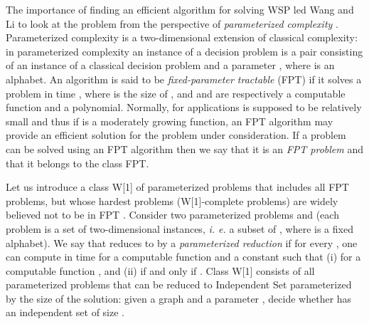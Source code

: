 \documentclass[jcs,crcready]{iosart1c}
\begin{document}
The importance of finding an efficient algorithm for solving WSP led Wang and Li to look at the problem from the perspective of \emph{parameterized complexity} \cite{DowFel13,Ni06}.
Parameterized complexity is a two-dimensional extension of classical complexity: in parameterized complexity an instance of a decision problem is a pair consisting of an instance  of a classical decision problem and a parameter , where  is an alphabet. An algorithm is said to be \emph{fixed-parameter tractable} (FPT) if it solves a problem in time , where  is the size of , and  and  are respectively a computable function and a polynomial. Normally, for applications  is supposed to be relatively small and thus if  is a moderately growing function, an FPT algorithm may provide an efficient solution for the problem under consideration. If a problem can be solved using an FPT algorithm then we say that it is an \emph{FPT problem} and that it belongs to the class FPT.

Let us introduce a class W[1] of parameterized problems that includes all FPT problems, but whose hardest problems (W[1]-complete problems) are widely believed not to be in FPT \cite{DowFel13,Ni06}. Consider two parameterized problems  and  (each problem is a set of two-dimensional instances, \emph{i. e.} a subset of , where  is a fixed alphabet). We say that  reduces to  by a {\em parameterized reduction} if for every , one can compute  in time  for a computable function  and a constant  such that (i)  for a computable function , and (ii)  if and only if .
Class W[1] consists of all parameterized problems that can be reduced to {\sc Independent Set} parameterized by the size of the solution: given a graph  and a parameter , decide whether  has an independent set of size .
\end{document}
